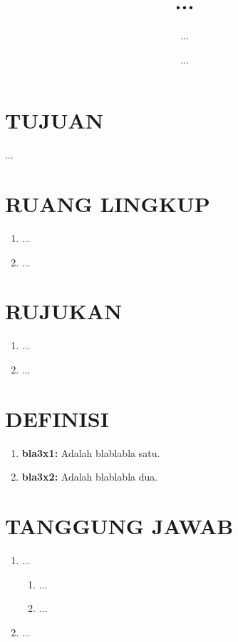 \documentclass[12pt]{sop}
\title{...}
\date{...}
\author{...}
\begin{document}
    \maketitle

    \section{TUJUAN}
    ...

    \section{RUANG LINGKUP}
    \begin{enumerate}
        \item ...
        \item ...
    \end{enumerate}

    \section{RUJUKAN}
    \begin{enumerate}
        \item ...
        \item ...
    \end{enumerate}

    \section{DEFINISI}
    \begin{enumerate}
        \item \textbf{bla3x1:} Adalah blablabla satu.
        \item \textbf{bla3x2:} Adalah blablabla dua.
    \end{enumerate}

    \section{TANGGUNG JAWAB}
    \begin{enumerate}
        \item ...
            \begin{enumerate}
                \item ...
                \item ...
            \end{enumerate}
        \item ...
    \end{enumerate}
\end{document}
